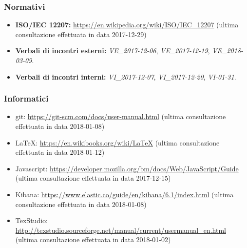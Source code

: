 	\subsubsection{Normativi}
		\begin{itemize}
			\item \textbf{ISO/IEC 12207:} \href{https://en.wikipedia.org/wiki/ISO/IEC\_12207}{https://en.wikipedia.org/wiki/ISO/IEC\_12207} (ultima consultazione effettuata in data 2017-12-29)
			\item \textbf{Verbali di incontri esterni:} \emph{VE\_2017-12-06}, \emph{VE\_2017-12-19}, \emph{VE\_2018-03-09}.
			\item \textbf{Verbali di incontri interni:}	\emph{VI\_2017-12-07}, \emph{VI\_2017-12-20}, \emph{VI-01-31}.
		\end{itemize}
	\subsubsection{Informatici}
	\begin{itemize}
		\item git:
		\href{https://git-scm.com/docs/user-manual.html}{https://git-scm.com/docs/user-manual.html} (ultima consultazione effettuata in data 2018-01-08)
		
		\item \LaTeX:  \href{https://en.wikibooks.org/wiki/LaTeX}{https://en.wikibooks.org/wiki/LaTeX} (ultima consultazione effettuata in data 2018-01-12)
		
		\item Javascript:
		\href{https://developer.mozilla.org/bm/docs/Web/JavaScript/Guide}{https://developer.mozilla.org/bm/docs/Web/JavaScript/Guide} (ultima consultazione effettuata in data 2017-12-15)
		
		\item Kibana: \href{https://www.elastic.co/guide/en/kibana/6.1/index.html}{https://www.elastic.co/guide/en/kibana/6.1/index.html} (ultima consultazione effettuata in data 2018-01-08)
		
		\item TexStudio: 
		\href{http://texstudio.sourceforge.net/manual/current/usermanual\_en.html}{http://texstudio.sourceforge.net/manual/current/usermanual\_en.html} (ultima consultazione effettuata in data 2018-01-02)
	\end{itemize}
	